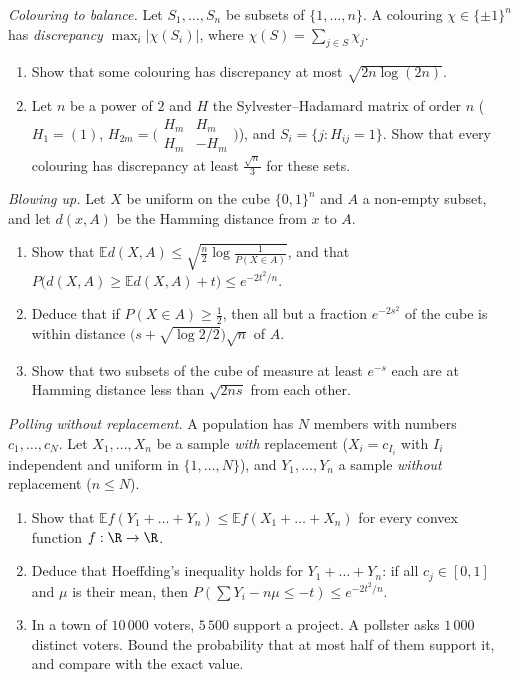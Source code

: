 \begin{exercise}[$\star$]\label{pb:discrepancy}
\emph{Colouring to balance.} Let $S_1,\dots,S_n$ be subsets of $\{1,\dots,n\}$. A colouring $\chi\in\{\pm1\}^n$ has \emph{discrepancy} $\max_i|\chi(S_i)|$, where
$\chi(S)=\sum_{j\in S}\chi_j$.
\begin{enumerate}[label=(\alph*)]
\item Show that some colouring has discrepancy at most $\sqrt{2n\log(2n)}$.
\item Let $n$ be a power of $2$ and $H$ the Sylvester--Hadamard matrix of order $n$ ($H_1=(1)$, $H_{2m}=\bigl(\begin{smallmatrix}H_m&H_m\\H_m&-H_m\end{smallmatrix}\bigr)$), and
$S_i=\{j:H_{ij}=1\}$. Show that every colouring has discrepancy at least $\frac{\sqrt n}3$ for these sets.
\end{enumerate}
\end{exercise}

\begin{exercise}[$\star$]\label{pb:blowup}
\emph{Blowing up.} Let $X$ be uniform on the cube $\{0,1\}^n$ and $A$ a non-empty subset, and let $d(x,A)$ be the Hamming distance from $x$ to $A$.
\begin{enumerate}[label=(\alph*)]
\item Show that $\mathbb Ed(X,A)\le\sqrt{\frac n2\log\frac1{P(X\in A)}}$, and that $P\bigl(d(X,A)\ge\mathbb Ed(X,A)+t\bigr)\le e^{-2t^2/n}$.
\item Deduce that if $P(X\in A)\ge\frac12$, then all but a fraction $e^{-2s^2}$ of the cube is within distance $\bigl(s+\sqrt{\log2/2}\bigr)\sqrt n$ of $A$.
\item Show that two subsets of the cube of measure at least $e^{-s}$ each are at Hamming distance less than $\sqrt{2ns}$ from each other.
\end{enumerate}
\end{exercise}

\begin{exercise}[$\star\star$]\label{pb:withoutrepl}
\emph{Polling without replacement.} A population has $N$ members with numbers $c_1,\dots,c_N$. Let $X_1,\dots,X_n$ be a sample \emph{with} replacement ($X_i=c_{I_i}$ with $I_i$
independent and uniform in $\{1,\dots,N\}$), and $Y_1,\dots,Y_n$ a sample \emph{without} replacement ($n\le N$).
\begin{enumerate}[label=(\alph*)]
\item Show that $\mathbb Ef(Y_1+\dots+Y_n)\le\mathbb Ef(X_1+\dots+X_n)$ for every convex function $f:\R\to\R$.
\item Deduce that Hoeffding's inequality holds for $Y_1+\dots+Y_n$: if all $c_j\in[0,1]$ and $\mu$ is their mean, then $P(\sum Y_i-n\mu\le-t)\le e^{-2t^2/n}$.
\item In a town of $10\,000$ voters, $5\,500$ support a project. A pollster asks $1\,000$ distinct voters. Bound the probability that at most half of them support it, and
compare with the exact value.
\end{enumerate}
\end{exercise}

